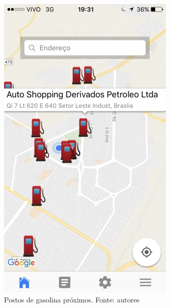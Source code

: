 \begin{anexosenv}
\begin{figure}[H]
    \centering
    \includegraphics[scale=0.5]{figuras/app_2.jpg}
    \caption[Postos de gasolina próximos]{Postos de gasolina próximos. Fonte: autores}
    \label{img:postos_de_gasolina_próximos}
\end{figure}


\end{anexosenv}
